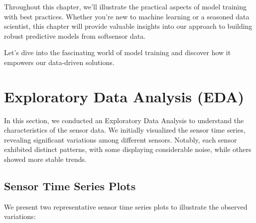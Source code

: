 \documentclass{report}
\begin{document}
Throughout this chapter, we'll illustrate the practical aspects of model training with best practices. Whether you're new to machine learning or a seasoned data scientist, this chapter will provide valuable insights into our approach to building robust predictive models from softsensor data.

Let's dive into the fascinating world of model training and discover how it empowers our data-driven solutions.

\section{Exploratory Data Analysis (EDA)}

In this section, we conducted an Exploratory Data Analysis to understand the characteristics of the sensor data. We initially visualized the sensor time series, revealing significant variations among different sensors. Notably, each sensor exhibited distinct patterns, with some displaying considerable noise, while others showed more stable trends.

\subsection{Sensor Time Series Plots}

We present two representative sensor time series plots to illustrate the observed variations:
\end{document}
